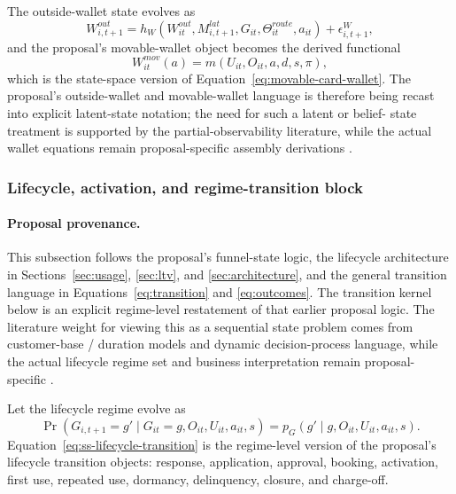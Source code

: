\documentclass[11pt]{article}
\newcommand{\1}{\mathbf{1}}
\begin{document}
The outside-wallet state evolves as
\begin{equation}
  W^{out}_{i,t+1}
  =
  h_W(W^{out}_{it},M^{lat}_{i,t+1},G_{it},\Theta^{route}_{it},a_{it})
  + \epsilon^W_{i,t+1},
  \label{eq:ss-outside-wallet-transition}
\end{equation}
and the proposal's movable-wallet object becomes the derived functional
\begin{equation}
  W^{mov}_{it}(a)
  =
  m(U_{it},O_{it},a,d,s,\pi),
  \label{eq:ss-movable-wallet}
\end{equation}
which is the state-space version of Equation~\eqref{eq:movable-card-wallet}.
The proposal's outside-wallet and movable-wallet language is therefore being
recast into explicit latent-state notation; the need for such a latent or belief-
state treatment is supported by the partial-observability literature, while the
actual wallet equations remain proposal-specific assembly derivations
\citep{smallwood1973pomdp,kaelbling1998pomdp}.

\subsubsection{Lifecycle, activation, and regime-transition block}
\label{subsec:state-space-lifecycle-block}

\paragraph{Proposal provenance.}
This subsection follows the proposal's funnel-state logic, the lifecycle
architecture in Sections~\ref{sec:usage}, \ref{sec:ltv}, and
\ref{sec:architecture}, and the general transition language in
Equations~\eqref{eq:transition} and \eqref{eq:outcomes}. The transition kernel
below is an explicit regime-level restatement of that earlier proposal logic.
The literature weight for viewing this as a sequential state problem comes from
customer-base / duration models and dynamic decision-process language, while the
actual lifecycle regime set and business interpretation remain proposal-specific
\citep{schmittlein1987counting,fader2005bgnbd,bolton1998duration,
puterman1994mdp,murphy2003dynamic}.

Let the lifecycle regime evolve as
\begin{equation}
  \Pr(G_{i,t+1}=g'\mid G_{it}=g,O_{it},U_{it},a_{it},s)
  = p_G(g'\mid g,O_{it},U_{it},a_{it},s).
  \label{eq:ss-lifecycle-transition}
\end{equation}
Equation~\eqref{eq:ss-lifecycle-transition} is the regime-level version of the
proposal's lifecycle transition objects: response, application, approval,
booking, activation, first use, repeated use, dormancy, delinquency, closure,
and charge-off.
\end{document}
